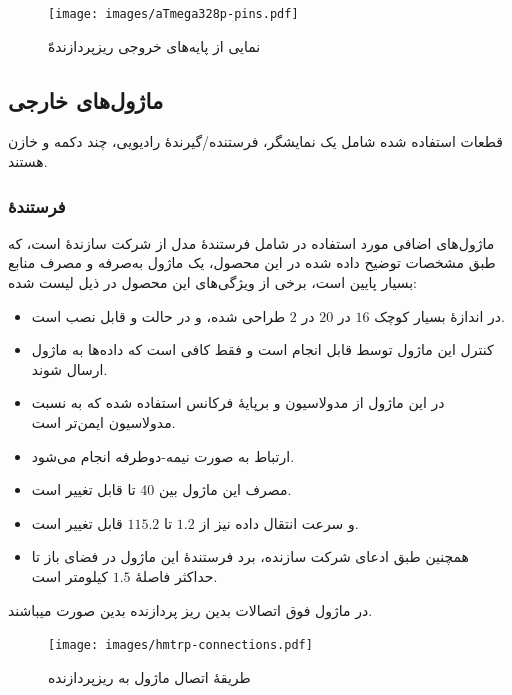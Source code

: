 \begin{figure}[!h]
	\begin{center}
		\texttt{[image: images/aTmega328p-pins.pdf]}
	\end{center}
	\caption{نمایی از پایه‌های خروجی ریزپردازندهّ }
	\label{fig1:sec1:chap1}
\end{figure}

\subsection{ماژول‌های خارجی}\label{subsec1:sec1:chap5}

قطعات استفاده شده شامل یک نمایشگر، فرستنده/گیرندهٔ رادیویی،‌ چند دکمه و خازن هستند.


\subsubsection{فرستندهٔ }\label{subsubsec2:subsec1:sec1:chap5}

ماژول‌های اضافی مورد استفاده در  شامل فرستندهٔ  مدل  از شرکت سازندهٔ  است، که طبق مشخصات توضیح داده شده در  این محصول، یک ماژول به‌صرفه و مصرف منابع بسیار پایین است، برخی از ویژگی‌های این محصول در ذیل لیست شده:
\cite{hmtrp-datasheet}

\begin{itemize}[nosep]
    \item در اندازهٔ بسیار کوچک $16$ در $20$ در $2$ طراحی شده، و در حالت  و  قابل نصب است.
    \item کنترل این ماژول توسط  قابل انجام است و فقط کافی است که داده‌ها به ماژول ارسال شوند.
    \item در این ماژول از مدولاسیون  و برپایهٔ فرکانس استفاده شده که به نسبت مدولاسیون  ایمن‌تر است.
    \item ارتباط به صورت نیمه-دوطرفه انجام می‌شود.
    \item مصرف این ماژول بین 40 تا قابل تغییر است.
    \item و سرعت انتقال داده نیز از $1.2$ تا $115.2$ قابل تغییر است.
    \item همچنین طبق ادعای شرکت سازنده، برد فرستندهٔ این ماژول در فضای باز تا حداکثر فاصلهٔ $1.5$ کیلومتر است.
\end{itemize}

در ماژول فوق اتصالات بدین ریز پردازنده بدین صورت میباشند.

\begin{figure}[!h]
	\begin{center}
		\texttt{[image: images/hmtrp-connections.pdf]}
	\end{center}
	\caption{طریقهٔ اتصال ماژول به ریزپردازنده}
	\label{fig1:sec1:chap1}
\end{figure}

